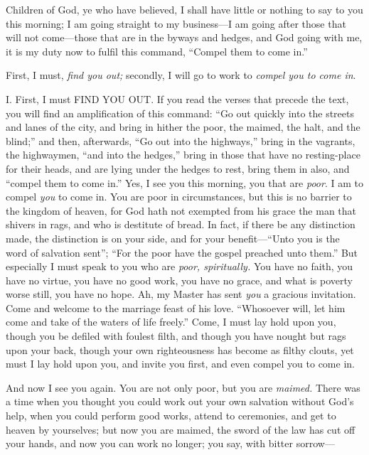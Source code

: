 \documentclass[
]{book}
\begin{document}
Children of God, ye who have believed, I shall have little or nothing to say to you this morning; I am going straight to my business---I am going after those that will not come---those that are in the byways and hedges, and God going with me, it is my duty now to fulfil this command, ``Compel them to come in.''

First, I must, \emph{find you out;} secondly, I will go to work to \emph{compel you to come in}.

I. First, I must FIND YOU OUT. If you read the verses that precede the text, you will find an amplification of this command: ``Go out quickly into the streets and lanes of the city, and bring in hither the poor, the maimed, the halt, and the blind;'' and then, afterwards, ``Go out into the highways,'' bring in the vagrants, the highwaymen, ``and into the hedges,'' bring in those that have no resting-place for their heads, and are lying under the hedges to rest, bring them in also, and ``compel them to come in.'' Yes, I see you this morning, you that are \emph{poor}. I am to compel \emph{you} to come in. You are poor in circumstances, but this is no barrier to the kingdom of heaven, for God hath not exempted from his grace the man that shivers in rags, and who is destitute of bread. In fact, if there be any distinction made, the distinction is on your side, and for your benefit---``Unto you is the word of salvation sent''; ``For the poor have the gospel preached unto them.'' But especially I must speak to you who are \emph{poor, spiritually.} You have no faith, you have no virtue, you have no good work, you have no grace, and what is poverty worse still, you have no hope. Ah, my Master has sent \emph{you} a gracious invitation. Come and welcome to the marriage feast of his love. ``Whosoever will, let him come and take of the waters of life freely.'' Come, I must lay hold upon you, though you be defiled with foulest filth, and though you have nought but rags upon your back, though your own righteousness has become as filthy clouts, yet must I lay hold upon you, and invite you first, and even compel you to come in.

And now I see you again. You are not only poor, but you are \emph{maimed.} There was a time when you thought you could work out your own salvation without God's help, when you could perform good works, attend to ceremonies, and get to heaven by yourselves; but now you are maimed, the sword of the law has cut off your hands, and now you can work no longer; you say, with bitter sorrow---
\end{document}
